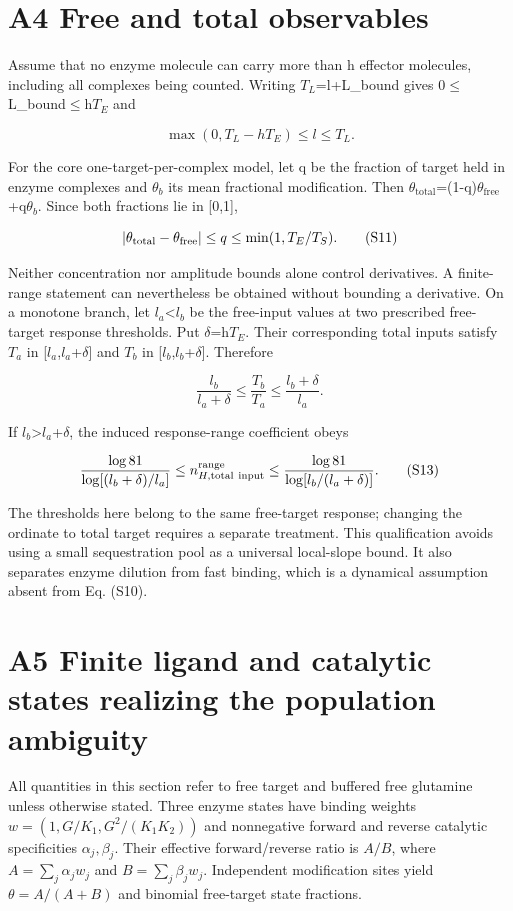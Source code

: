 \documentclass[11pt]{article}
\begin{document}
\section*{A4 Free and total observables}

Assume that no enzyme molecule can carry more than h effector molecules, including all complexes being counted. Writing $T_L$=l+L\_bound gives 0$\le$L\_bound$\le$h$T_E$ and


\[
\max(0,T_L-hT_E)\le l\le T_L. \tag{S10}
\]

For the core one-target-per-complex model, let q be the fraction of target held in enzyme complexes and $\theta_b$ its mean fractional modification. Then $\theta_{\mathrm{total}}$=(1-q)$\theta_{\mathrm{free}}$+q$\theta_b$. Since both fractions lie in [0,1],


\[
|\theta_{\rm total}-\theta_{\rm free}|\le q\le
\min(1,T_E/T_S). \tag{S11}
\]

Neither concentration nor amplitude bounds alone control derivatives. A finite-range statement can nevertheless be obtained without bounding a derivative. On a monotone branch, let $l_a$<$l_b$ be the free-input values at two prescribed free-target response thresholds. Put $\delta$=h$T_E$. Their corresponding total inputs satisfy $T_a$ in [$l_a$,$l_a$+$\delta$] and $T_b$ in [$l_b$,$l_b$+$\delta$]. Therefore


\[
\frac{l_b}{l_a+\delta}\le \frac{T_b}{T_a}\le\frac{l_b+\delta}{l_a}. \tag{S12}
\]

If $l_b$>$l_a$+$\delta$, the induced response-range coefficient obeys


\[
\frac{\log81}{\log[(l_b+\delta)/l_a]}
\le n_{H,\rm total\ input}^{\rm range}
\le\frac{\log81}{\log[l_b/(l_a+\delta)]}. \tag{S13}
\]

The thresholds here belong to the same free-target response; changing the ordinate to total target requires a separate treatment. This qualification avoids using a small sequestration pool as a universal local-slope bound. It also separates enzyme dilution from fast binding, which is a dynamical assumption absent from Eq. (S10).


\section*{A5 Finite ligand and catalytic states realizing the population ambiguity}

All quantities in this section refer to free target and buffered free glutamine unless otherwise stated. Three enzyme states have binding weights $w=(1,G/K_1,G^2/(K_1K_2))$ and nonnegative forward and reverse catalytic specificities $\alpha_j,\beta_j$. Their effective forward/reverse ratio is $A/B$, where $A=\sum_j\alpha_jw_j$ and $B=\sum_j\beta_jw_j$. Independent modification sites yield $\theta=A/(A+B)$ and binomial free-target state fractions.
\end{document}
